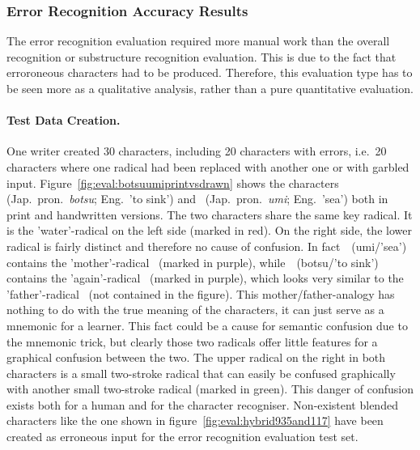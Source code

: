 \subsubsection{Error Recognition Accuracy Results}
\label{sec:eval:resulterrorrecognition}

The error recognition evaluation required more manual work than the overall 
recognition or substructure recognition evaluation. This is due to the fact
that erroroneous characters had to be produced.
Therefore, this evaluation type has to be seen more as a 
qualitative analysis, rather than a pure quantitative evaluation.

\paragraph{Test Data Creation.}
One writer created 30 characters, including 20 characters with errors,
i.e.\ 20 characters where one radical had been replaced with another one
or with garbled input. Figure~\ref{fig:eval:botsuumiprintvsdrawn} shows the
characters~ (Jap.\ pron.\ \emph{botsu}; Eng.\ 'to sink') %
and~ (Jap.\ pron.\ \emph{umi}; Eng.\ 'sea') %
both in print and handwritten versions.
The two characters share the same key radical. It is the 'water'-radical 
on the left side (marked in red). 
On the right side, the lower radical is fairly distinct
and therefore no cause of confusion. In fact~~(umi/'sea') contains the 
'mother'-radical~ (marked in purple), 
while~~(botsu/'to sink') contains the 
'again'-radical~ (marked in purple), 
which looks very similar to the 
'father'-radical~ (not contained in the figure).
This mother/father-analogy has nothing to do with the true meaning
of the characters, it can just serve as a mnemonic for a learner.
This fact could be a cause for semantic confusion due to the 
mnemonic trick, but clearly those two radicals offer little features 
for a graphical confusion between the two.
The upper radical on the right in both characters is a small two-stroke
radical that can easily be confused graphically with another small two-stroke 
radical (marked in green). This danger of confusion exists both for a human
and for the character recogniser. 
Non-existent blended characters like the one shown in 
figure~\ref{fig:eval:hybrid935and117} have been created as erroneous input
for the error recognition evaluation test set.
